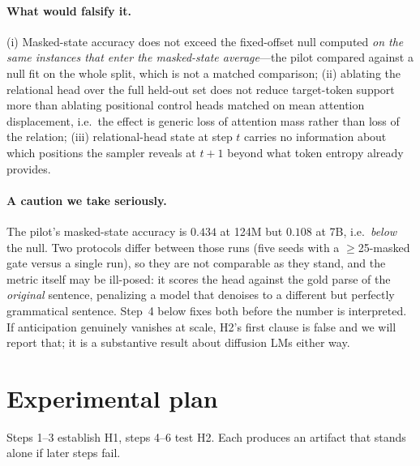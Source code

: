\documentclass{article}
\begin{document}
\paragraph{What would falsify it.} (i) Masked-state accuracy does not exceed the
fixed-offset null computed \emph{on the same instances that enter the
masked-state average}---the pilot compared against a null fit on the whole
split, which is not a matched comparison; (ii) ablating the relational head over
the full held-out set does not reduce target-token support more than ablating
positional control heads matched on mean attention displacement, i.e.\ the effect
is generic loss of attention mass rather than loss of the relation; (iii)
relational-head state at step $t$ carries no information about which positions
the sampler reveals at $t{+}1$ beyond what token entropy already provides.

\paragraph{A caution we take seriously.} The pilot's masked-state accuracy is
$0.434$ at 124M but $0.108$ at 7B, i.e.\ \emph{below} the null. Two protocols
differ between those runs (five seeds with a $\ge$25-masked gate versus a single
run), so they are not comparable as they stand, and the metric itself may be
ill-posed: it scores the head against the gold parse of the \emph{original}
sentence, penalizing a model that denoises to a different but perfectly
grammatical sentence. Step~4 below fixes both before the number is interpreted.
If anticipation genuinely vanishes at scale, H2's first clause is false and we
will report that; it is a substantive result about diffusion LMs either way.

\section{Experimental plan}

Steps 1--3 establish H1, steps 4--6 test H2. Each produces an artifact that
stands alone if later steps fail.
\end{document}
